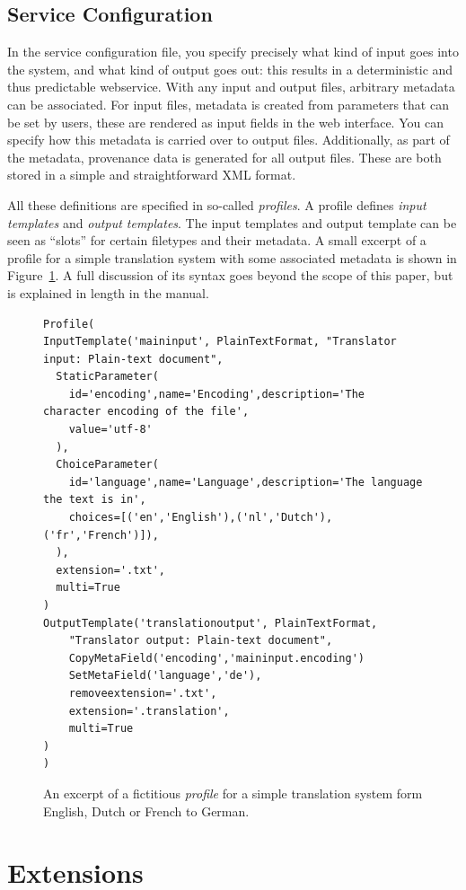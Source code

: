 \documentclass[11pt]{article}
\begin{document}
\subsection{Service Configuration}

In the service configuration file, you specify precisely what kind of input
goes into the system, and what kind of output goes out: this results in a
deterministic and thus predictable webservice.  With any input and output
files, arbitrary metadata can be associated. For input files, metadata is
created from parameters that can be set by users, these are rendered as input
fields in the web interface.  You can specify how this metadata is carried over
to output files.  Additionally, as part of the metadata, provenance data is
generated for all output files. These are both stored in a simple and
straightforward XML format.

All these definitions are specified in so-called \emph{profiles}. A
profile defines \emph{input templates} and \emph{output templates}. The input
templates and output template can be seen as ``slots'' for certain filetypes
and their metadata. A small excerpt of a profile for a simple translation system with
some associated metadata is shown in Figure~\ref{fig:profile}. A full
discussion of its syntax goes beyond the scope of this paper, but is explained
in length in the manual.

\begin{figure}[h]
{\footnotesize{
\begin{verbatim}
Profile(
InputTemplate('maininput', PlainTextFormat, "Translator input: Plain-text document",  
  StaticParameter(
    id='encoding',name='Encoding',description='The character encoding of the file', 
    value='utf-8'
  ),  
  ChoiceParameter(
    id='language',name='Language',description='The language the text is in', 
    choices=[('en','English'),('nl','Dutch'),('fr','French')]),
  ),      
  extension='.txt',
  multi=True
)
OutputTemplate('translationoutput', PlainTextFormat,
    "Translator output: Plain-text document",  
    CopyMetaField('encoding','maininput.encoding')
    SetMetaField('language','de'),
    removeextension='.txt',
    extension='.translation',
    multi=True
)
)
\end{verbatim}
}}
\caption{An excerpt of a fictitious \emph{profile} for a simple translation system form
English, Dutch or French to German.}
\label{fig:profile}
\end{figure}


\section{Extensions}
\end{document}

